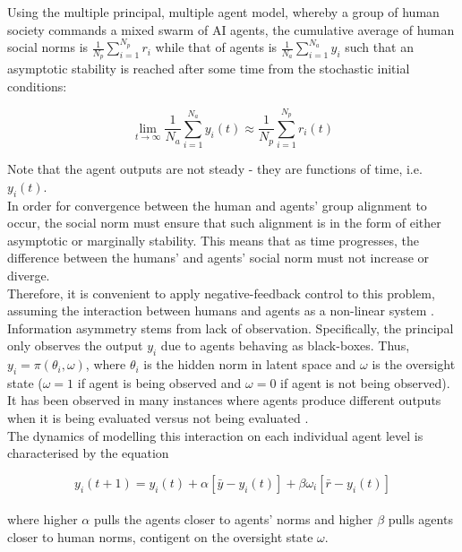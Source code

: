 \documentclass{article}
\begin{document}
Using the multiple principal, multiple agent model, whereby a group of human society commands a mixed swarm of AI agents, the cumulative average of human social norms is $\frac{1}{N_p} \sum_{i=1}^{N_p} r_i$  while that of agents is $\frac{1}{N_a} \sum_{i=1}^{N_a} y_i$ such that an asymptotic stability is reached after some time from the stochastic initial conditions:


\[
\lim_{t\to\infty}   \frac{1}{N_a} \sum_{i=1}^{N_a} y_i(t) \approx \frac{1}{N_p} \sum_{i=1}^{N_p} r_i(t)
\]

Note that the agent outputs are not steady - they are functions of time, i.e. $y_i(t)$. \\


In order for convergence between the human and agents' group alignment to occur, the social norm must ensure that such alignment is in the form of either asymptotic or marginally stability. This means that as time progresses, the difference between the humans' and agents' social norm must not increase or diverge. \\

Therefore, it is convenient to apply negative-feedback control to this problem, assuming the interaction between humans and agents as a non-linear system \citep{khalil2002}. \\

Information asymmetry stems from lack of observation. Specifically, the principal only observes the output $y_i$ due to agents behaving as black-boxes. Thus, $y_i = \pi(\theta_i, \omega)$, where $\theta_i$ is the hidden norm in latent space and $\omega$ is the oversight state ($\omega = 1$ if agent is being observed and $\omega = 0$ if agent is not being observed). It has been observed in many instances where agents produce different outputs when it is being evaluated versus not being evaluated \citep{meinke2024,greenblatt2024,schoen2025}. \\

The dynamics of modelling this interaction on each individual agent level is characterised by the equation \citep{degroot1974,friedkin1990}

\[
y_i(t+1) = y_i(t) + \alpha [ \bar y - y_i(t) ] + \beta \omega_i[\bar r-y_i(t)]
\] \\

where higher $\alpha$ pulls the agents closer to agents' norms and higher $\beta$ pulls agents closer to human norms, contigent on the oversight state $\omega$. \\
\end{document}
